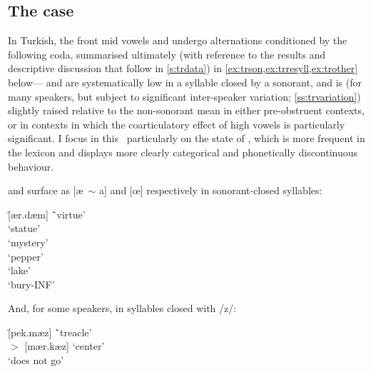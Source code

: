 \subsection{The case}\label{ss:trcase}

In Turkish, the front mid vowels  and \ur{\o} undergo alternations conditioned by the following coda, summarised ultimately (with reference to the results and descriptive discussion that follow in \cref{s:trdata}) in \cref{ex:trson,ex:trresyll,ex:trother} below--- and \ur{\o} are systematically low in a syllable closed by a sonorant, and  is (for many speakers, but subject to significant inter-speaker variation; \cref{ss:trvariation}) slightly raised relative to the non-sonorant mean in either pre-obstruent contexts, or in contexts in which the coarticulatory effect of high vowels is particularly significant. I focus in this \instance \ particularly on the state of , which is more frequent in the lexicon and displays more clearly categorical and phonetically discontinuous behaviour.

\begin{example}\label{ex:trson}
 and \ur{\o} surface as [\ae \ $\sim$ a] and [\oe] respectively in sonorant-closed syllables:
  \begin{tabbing}
       \tab[2cm] \= [ær.dæm] \tab[3cm] \=`virtue' \\
        \>`statue' \\
       \> [gi.zæm] \>`mystery' \\
       \> [bi.b\ae r] \>`pepper' \\
       \> [g\oe l] \>`lake'\\
       \> [g\oe m.mek] \>`bury-{\sc\scriptsize INF}'
  \end{tabbing}
\end{example}

\begin{example}\label{ex:trz}
And, for some speakers, in syllables closed with /z/:
  \begin{tabbing}
       \tab[2cm] \= [pek.mæz] \tab[3cm] \=`treacle' \\
        $>$ [mær.kæz] \>`center' \\
        \>`does not go'
  \end{tabbing}
\end{example}

